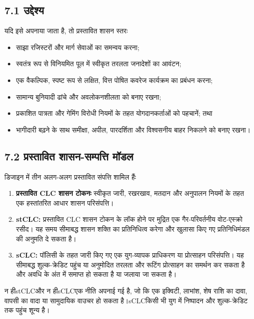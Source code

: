 \documentclass[11pt]{article}
\begin{document}
\subsection*{7.1 उद्देश्य}

यदि इसे अपनाया जाता है, तो प्रस्तावित शासन स्तरः

\begin{itemize}[leftmargin=*]
\item साझा रजिस्टरों और मार्ग सेवाओं का समन्वय करना;
\item स्वतंत्र रूप से विनियमित पूल में स्वीकृत तरलता जनादेशों का आवंटन;
\item एक वैकल्पिक, स्पष्ट रूप से लक्षित, वित्त पोषित कवरेज कार्यक्रम का प्रबंधन करना;
\item सामान्य बुनियादी ढांचे और अवलोकनशीलता को बनाए रखना;
\item प्रकाशित पात्रता और गेमिंग विरोधी नियमों के तहत योगदानकर्ताओं को पहचानें; तथा
\item भागीदारी बढ़ने के साथ समीक्षा, अपील, पारदर्शिता और विश्वसनीय बाहर निकलने को बनाए रखना।
\end{itemize}
\subsection*{7.2 प्रस्तावित शासन-सम्पत्ति मॉडल}

डिजाइन में तीन अलग-अलग प्रस्तावित संपत्ति शामिल हैंः

\begin{enumerate}[leftmargin=*]
\item \textbf{प्रस्तावित CLC शासन टोकनः} स्वीकृत जारी, रखरखाव, मतदान और अनुपालन नियमों के तहत एक हस्तांतरित आधार शासन परिसंपत्ति।
\item \textbf{stCLC:} प्रस्तावित CLC शासन टोकन के लॉक होने पर मुद्रित एक गैर-परिवर्तनीय वोट-एस्क्रो रसीद। यह समय सीमाबद्ध शासन शक्ति का प्रतिनिधित्व करेगा और खुलासा किए गए प्रतिनिधिमंडल की अनुमति दे सकता है।
\item \textbf{sCLC:} पॉलिसी के तहत जारी किए गए एक युग-व्यापक प्राधिकरण या प्रोत्साहन परिसंपत्ति। यह सीमाबद्ध शुल्क-क्रेडिट पहुंच या अनुमोदित तरलता और रूटिंग प्रोत्साहन का समर्थन कर सकता है और अवधि के अंत में समाप्त हो सकता है या जलाया जा सकता है।
\end{enumerate}
न हीstCLCऔर न हीsCLCएक नीति अपनाई गई है, जो कि एक इक्विटी, लाभांश, शेष राशि का दावा, वापसी का वादा या सामुदायिक वाउचर हो सकता है।sCLCकिसी भी युग में निष्पादन और शुल्क-क्रेडिट तक पहुंच शून्य है।
\end{document}
